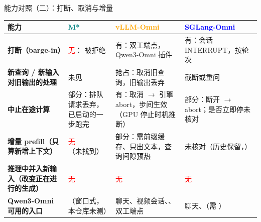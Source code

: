 \begin{frame}[t]{能力对照（二）：打断、取消与增量}
\scriptsize
\renewcommand{\arraystretch}{1.12}
\setlength{\tabcolsep}{3pt}
\begin{tabularx}{\textwidth}{>{\bfseries}p{2.9cm} Y Y Y}
\toprule
{}
能力 & \textcolor{Teal}{M*} & \textcolor{Orange}{vLLM-Omni} & \textcolor{Blue}{SGLang-Omni} \\
\midrule
打断（barge-in） & \textcolor{Red}{无}： 被拒绝 & 有：双工端点，Qwen3-Omni 插件  & 有：会话 INTERRUPT，按轮次 \\
新查询 / 新输入对旧输出的处理 & 未见 & 抢占：取消旧查询，旧输出丢弃 & 截断或重问 \\
中止在途计算 & 部分：排队请求丢弃，已启动的一步跑完 & 有：取消 $\to$ 引擎 abort，步间生效（GPU 停止时机推断） & 部分：断开 $\to$ abort；是否立即停未核对 \\
增量 prefill（只算新增上下文） & \textcolor{Red}{无}（未找到） & 部分：需前缀缓存、只出文本，查询间隙预热 & 未核对（历史保留，） \\
推理中并入新输入（改变正在进行的生成） & \textcolor{Red}{无} & \textcolor{Red}{无} & \textcolor{Red}{无} \\
Qwen3-Omni 可用的入口 & （窗口式，本仓库未测） & 聊天、视频会话、、双工端点 & 聊天、（需 ） \\
\bottomrule
\end{tabularx}
\par{}
\par{}
\end{frame}

